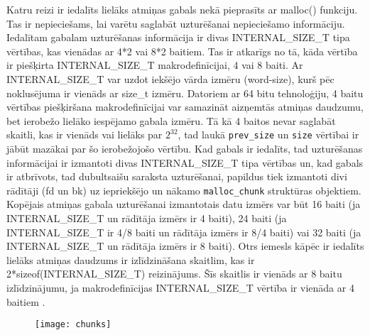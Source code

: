 Katru reizi ir iedalīts lielāks atmiņas gabals nekā pieprasīts ar malloc() funkciju.
Tas ir nepieciešams, lai varētu saglabāt uzturēšanai nepieciešamo informāciju. 
Iedalītam gabalam uzturēšanas informācija ir divas INTERNAL\_SIZE\_T tipa vērtības, kas vienādas ar 4*2 vai 8*2 baitiem. 
Tas ir atkarīgs no tā, kāda vērtība ir piešķirta INTERNAL\_SIZE\_T makrodefinīcijai, 4 vai 8 baiti.
Ar INTERNAL\_SIZE\_T var uzdot iekšējo vārda izmēru (word-size), kurš pēc noklusējuma ir vienāds ar size\_t izmēru.
Datoriem ar 64 bitu tehnoloģiju, 4 baitu vērtības piešķiršana makrodefinīcijai  var samazināt aizņemtās atmiņas daudzumu, bet ierobežo lielāko iespējamo gabala izmēru.
Tā kā 4 baitos nevar saglabāt skaitli, kas ir vienāds vai lielāks par \(2^{32}\), tad laukā \texttt{prev\_size} un \texttt{size} vērtībai ir jābūt mazākai par šo ierobežojošo vērtību.
Kad gabals ir iedalīts, tad uzturēšanas informācijai ir izmantoti divas INTERNAL\_SIZE\_T tipa vērtības un, kad gabals ir atbrīvots, tad  dubultsaišu saraksta uzturēšanai, papildus tiek izmantoti divi rādītāji (fd un bk) uz iepriekšējo un nākamo \texttt{malloc\_chunk} struktūras objektiem. 
Kopējais atmiņas gabala uzturēšanai izmantotais datu izmērs var būt 16 baiti (ja INTERNAL\_SIZE\_T un rādītāja izmērs ir 4 baiti), 24 baiti (ja INTERNAL\_SIZE\_T ir 4/8 baiti un rādītāja izmērs ir 8/4 baiti) vai 32 baiti (ja INTERNAL\_SIZE\_T un rādītāja izmērs ir 8 baiti).  
Otrs iemesls kāpēc ir iedalīts lielāks atmiņas daudzums ir izlīdzināšana skaitlim, kas ir  2*sizeof(INTERNAL\_SIZE\_T) reizinājums. Šīs skaitlis ir vienāds ar 8 baitu izlīdzinājumu, ja  makrodefinīcijas INTERNAL\_SIZE\_T vērtība  ir vienāda ar 4 baitiem \cite {MALLOC}.  



 \begin{figure}[h]
\begin{center}
\texttt{[image: chunks]}
\end{center}
\caption{\textbf{\fontsize{11}{12}\selectfont {Atmiņas gabalu struktūra}}}
\label{fig:chunks}
\end{figure}

